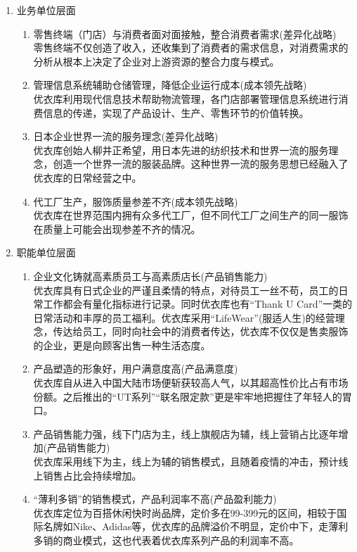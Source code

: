 \documentclass{xjtureport}
\begin{document}
\begin{enumerate}
\begin{enumerate}
\end{enumerate}
\item 业务单位层面
\begin{enumerate}
    \item 零售终端（门店）与消费者面对面接触，整合消费者需求(差异化战略)\\
    零售终端不仅创造了收入，还收集到了消费者的需求信息，对消费需求的分析从根本上决定了企业对上游资源的整合力度与模式。
    \item 管理信息系统辅助仓储管理，降低企业运行成本(成本领先战略)\\
    优衣库利用现代信息技术帮助物流管理，各门店部署管理信息系统进行消费信息的传递，实现了产品设计、生产、零售环节的价值转换。
    \item 日本企业世界一流的服务理念(差异化战略)\\
    优衣库创始人柳井正希望，用日本先进的纺织技术和世界一流的服务理念，创造一个世界一流的服装品牌。这种世界一流的服务思想已经融入了优衣库的日常经营之中。
    \item 代工厂生产，服饰质量参差不齐(成本领先战略)\\
    优衣库在世界范围内拥有众多代工厂，但不同代工厂之间生产的同一服饰在质量上可能会出现参差不齐的情况。
\end{enumerate}
\item 职能单位层面
\begin{enumerate}
    \item 企业文化铸就高素质员工与高素质店长(产品销售能力)\\
    优衣库具有日式企业的严谨且柔情的特点，对待员工一丝不苟，员工的日常工作都会有量化指标进行记录。同时优衣库也有“Thank U Card”一类的日常活动和丰厚的员工福利。优衣库采用“LifeWear”(服适人生)的经营理念，传达给员工，同时向社会中的消费者传达，优衣库不仅仅是售卖服饰的企业，更是向顾客出售一种生活态度。
    \item  产品塑造的形象好，用户满意度高(产品满意度)\\
    优衣库自从进入中国大陆市场便斩获较高人气，以其超高性价比占有市场份额。之后推出的“UT系列”“联名限定款”更是牢牢地把握住了年轻人的胃口。
    \item 产品销售能力强，线下门店为主，线上旗舰店为辅，线上营销占比逐年增加(产品销售能力)\\
    优衣库采用线下为主，线上为辅的销售模式，且随着疫情的冲击，预计线上销售占比会持续增加。
    \item “薄利多销”的销售模式，产品利润率不高(产品盈利能力)\\
    优衣库定位为百搭休闲快时尚品牌，定价多在99-399元的区间，相较于国际名牌如Nike、Adidas等，优衣库的品牌溢价不明显，定价中下，走薄利多销的商业模式，这也代表着优衣库系列产品的利润率不高。
\end{enumerate}
\end{enumerate}
\end{document}
